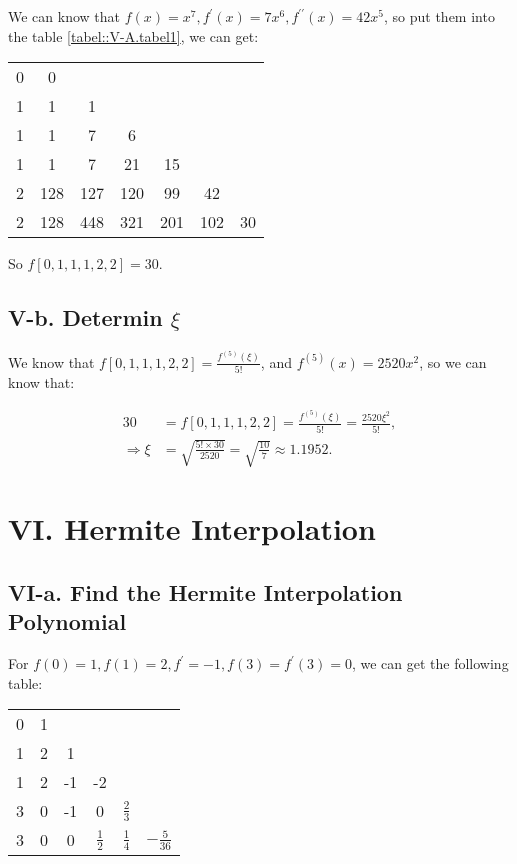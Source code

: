 \documentclass[a4paper]{article}
\begin{document}
We can know that $f(x) = x^7, f^\prime(x)=7x^6, f^{\prime \prime}(x) = 42x^5$, so put them into the table \ref{tabel::V-A.tabel1}, we can get:

\begin{table}[H]
  \centering
  \begin{tabular}{c|cccccc}
    0 & 0   &     &     &     &     & \\
    1 & 1   & 1   &     &     &     & \\
    1 & 1   & 7   & 6   &     &     & \\
    1 & 1   & 7   & 21  & 15  &     & \\
    2 & 128 & 127 & 120 & 99  & 42  & \\
    2 & 128 & 448 & 321 & 201 & 102 & 30 \\
  \end{tabular}
  \label{tabel::V-A.tabel2}
\end{table}

So $f[0,1,1,1,2,2] = 30$.

\subsection*{V-b. Determin $\xi$}
We know that $f[0,1,1,1,2,2] = \frac{f^{(5)}(\xi)}{5!}$, and $f^{(5)}(x) = 2520x^2$, so we can know that:

\begin{equation}
  \begin{aligned}
    30 &= f[0,1,1,1,2,2] = \frac{f^{(5)}(\xi)}{5!} = \frac{2520\xi^2}{5!}, \\
    \Rightarrow \xi &= \sqrt{\frac{5! \times 30}{2520}} = \sqrt{\frac{10}{7}} \approx 1.1952.
  \end{aligned}
\end{equation}

\section*{VI. Hermite Interpolation}
\subsection*{VI-a. Find the Hermite Interpolation Polynomial}
For $f(0)=1,f(1)=2,f^{\prime}=-1,f(3)=f^{\prime}(3)=0$, we can get the following table:

\begin{table}[H]
  \centering
  \begin{tabular}{c|ccccc}
    0 & 1 &     &     &     & \\
    1 & 2 & 1   &     &     & \\
    1 & 2 & -1  & -2   &     & \\
    3 & 0 & -1  & 0  & $\frac{2}{3}$  & \\
    3 & 0 & 0   & $\frac{1}{2}$ & $\frac{1}{4}$  &$-\frac{5}{36}$ \\
  \end{tabular}
  \label{tabel::VI-A.tabel1}
\end{table}
\end{document}
